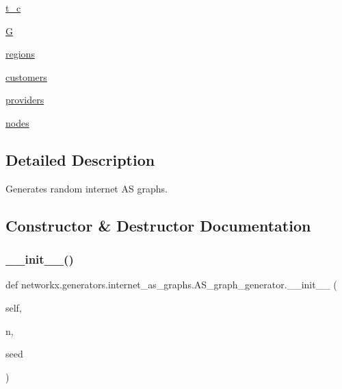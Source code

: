 \begin{DoxyCompactItemize}
\item 
\hyperlink{classnetworkx_1_1generators_1_1internet__as__graphs_1_1AS__graph__generator_a109e9e7b4259159c2bf08161c4a5a69e}{t\+\_\+c}
\item 
\hyperlink{classnetworkx_1_1generators_1_1internet__as__graphs_1_1AS__graph__generator_aad1c86a010348415b0c724edbb8c18d0}{G}
\item 
\hyperlink{classnetworkx_1_1generators_1_1internet__as__graphs_1_1AS__graph__generator_a31abbe9e1d514d9db5268889820baf66}{regions}
\item 
\hyperlink{classnetworkx_1_1generators_1_1internet__as__graphs_1_1AS__graph__generator_a837ee44614d0ac5acbd2757a64d52f50}{customers}
\item 
\hyperlink{classnetworkx_1_1generators_1_1internet__as__graphs_1_1AS__graph__generator_a14b579b56c1d8c94a79289f7d6d66ee0}{providers}
\item 
\hyperlink{classnetworkx_1_1generators_1_1internet__as__graphs_1_1AS__graph__generator_a7bc4f896b2e879b00d0f374ca84e44d6}{nodes}
\end{DoxyCompactItemize}


\subsection{Detailed Description}
\begin{DoxyVerb}Generates random internet AS graphs.\end{DoxyVerb}
 

\subsection{Constructor \& Destructor Documentation}
\mbox{\label{classnetworkx_1_1generators_1_1internet__as__graphs_1_1AS__graph__generator_a5f6c3b8bf8473ff489f32f144e42746b}} 
\subsubsection{\texorpdfstring{\+\_\+\+\_\+init\+\_\+\+\_\+()}{\_\_init\_\_()}}
{\footnotesize\ttfamily def networkx.\+generators.\+internet\+\_\+as\+\_\+graphs.\+A\+S\+\_\+graph\+\_\+generator.\+\_\+\+\_\+init\+\_\+\+\_\+ (\begin{DoxyParamCaption}\item[{}]{self,  }\item[{}]{n,  }\item[{}]{seed }\end{DoxyParamCaption})}

